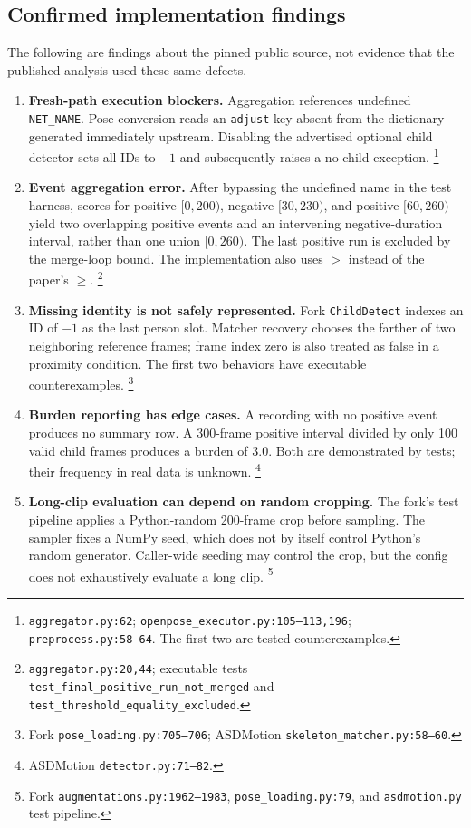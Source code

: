 \subsection{Confirmed implementation findings}
The following are findings about the pinned public source, not evidence
that the published analysis used these same defects.
\begin{enumerate}
\item \textbf{Fresh-path execution blockers.} Aggregation references
undefined \texttt{NET\_NAME}. Pose conversion reads an \texttt{adjust}
key absent from the dictionary generated immediately upstream.
Disabling the advertised optional child detector sets all IDs to $-1$
and subsequently raises a no-child exception.
\footnote{\texttt{aggregator.py:62};
\texttt{openpose\_executor.py:105--113,196};
\texttt{preprocess.py:58--64}. The first two are tested counterexamples.}
\item \textbf{Event aggregation error.} After bypassing the undefined
name in the test harness, scores for positive $[0,200)$, negative
$[30,230)$, and positive $[60,260)$ yield two overlapping positive events
and an intervening negative-duration interval, rather than one union
$[0,260)$. The last positive run is excluded by the merge-loop bound.
The implementation also uses $>$ instead of the paper's $\geq$.
\footnote{\texttt{aggregator.py:20,44}; executable tests
\texttt{test\_final\_positive\_run\_not\_merged} and
\texttt{test\_threshold\_equality\_excluded}.}
\item \textbf{Missing identity is not safely represented.}
Fork \texttt{ChildDetect} indexes an ID of $-1$ as the last person slot.
Matcher recovery chooses the farther of two neighboring reference frames;
frame index zero is also treated as false in a proximity condition.
The first two behaviors have executable counterexamples.
\footnote{Fork \texttt{pose\_loading.py:705--706}; ASDMotion
\texttt{skeleton\_matcher.py:58--60}.}
\item \textbf{Burden reporting has edge cases.} A recording with no
positive event produces no summary row. A 300-frame positive interval
divided by only 100 valid child frames produces a burden of 3.0.
Both are demonstrated by tests; their frequency in real data is unknown.
\footnote{ASDMotion \texttt{detector.py:71--82}.}
\item \textbf{Long-clip evaluation can depend on random cropping.}
The fork's test pipeline applies a Python-random 200-frame crop before
sampling. The sampler fixes a NumPy seed, which does not by itself control
Python's random generator. Caller-wide seeding may control the crop, but
the config does not exhaustively evaluate a long clip.
\footnote{Fork \texttt{augmentations.py:1962--1983},
\texttt{pose\_loading.py:79}, and \texttt{asdmotion.py} test pipeline.}
\end{enumerate}


